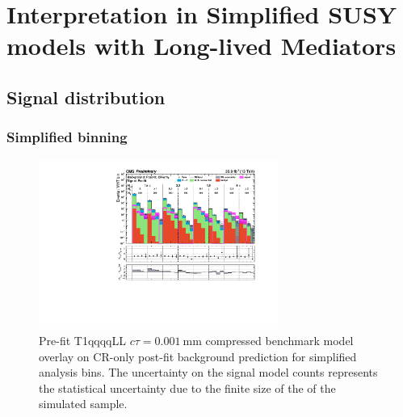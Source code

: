 \section{Interpretation in Simplified SUSY models with Long-lived Mediators}
\label{app:LLP}

\subsection{Signal distribution}
\label{app:susyll-mr-plots}

\subsubsection{Simplified binning}

\begin{figure}[h!]
    \begin{center}
        \includegraphics[width=0.7\textwidth]{figures/susyLLResults/app/T1qqqqLL_ctau_0p001_mGluino-1000_mLSP-900/all_full-fit-sig}
        \caption{
            Pre-fit T1qqqqLL $c\tau=0.001~\mathrm{mm}$ compressed benchmark
            model overlay on CR-only post-fit background prediction for
            simplified analysis bins. The uncertainty on the signal model counts
            represents the statistical uncertainty due to the finite size of the
            of the simulated sample.
        }
        \label{fig:T1qqqqLL_ctau_0p001_compressed_MR_simp}
    \end{center}
\end{figure}

